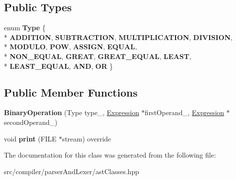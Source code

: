 \subsection*{Public Types}
\begin{DoxyCompactItemize}
\item 
enum {\bfseries Type} \{ \\*
{\bfseries A\+D\+D\+I\+T\+I\+ON}, 
{\bfseries S\+U\+B\+T\+R\+A\+C\+T\+I\+ON}, 
{\bfseries M\+U\+L\+T\+I\+P\+L\+I\+C\+A\+T\+I\+ON}, 
{\bfseries D\+I\+V\+I\+S\+I\+ON}, 
\\*
{\bfseries M\+O\+D\+U\+LO}, 
{\bfseries P\+OW}, 
{\bfseries A\+S\+S\+I\+GN}, 
{\bfseries E\+Q\+U\+AL}, 
\\*
{\bfseries N\+O\+N\+\_\+\+E\+Q\+U\+AL}, 
{\bfseries G\+R\+E\+AT}, 
{\bfseries G\+R\+E\+A\+T\+\_\+\+E\+Q\+U\+AL}, 
{\bfseries L\+E\+A\+ST}, 
\\*
{\bfseries L\+E\+A\+S\+T\+\_\+\+E\+Q\+U\+AL}, 
{\bfseries A\+ND}, 
{\bfseries OR}
 \}\hypertarget{classslang__AST__NODES_1_1BinaryOperation_ace9b829d1a97c814f923a04027be5bc5}{}\label{classslang__AST__NODES_1_1BinaryOperation_ace9b829d1a97c814f923a04027be5bc5}

\end{DoxyCompactItemize}
\subsection*{Public Member Functions}
\begin{DoxyCompactItemize}
\item 
{\bfseries Binary\+Operation} (Type type\+\_\+, \hyperlink{classslang__AST__NODES_1_1Expression}{Expression} $\ast$first\+Operand\+\_\+, \hyperlink{classslang__AST__NODES_1_1Expression}{Expression} $\ast$second\+Operand\+\_\+)\hypertarget{classslang__AST__NODES_1_1BinaryOperation_a0f81ad9d8548cf8fe9036a1ac2cd946a}{}\label{classslang__AST__NODES_1_1BinaryOperation_a0f81ad9d8548cf8fe9036a1ac2cd946a}

\item 
void {\bfseries print} (F\+I\+LE $\ast$stream) override\hypertarget{classslang__AST__NODES_1_1BinaryOperation_a73846657effdef8eaf520da3e25f61a2}{}\label{classslang__AST__NODES_1_1BinaryOperation_a73846657effdef8eaf520da3e25f61a2}

\end{DoxyCompactItemize}


The documentation for this class was generated from the following file\+:\begin{DoxyCompactItemize}
\item 
src/compiler/parser\+And\+Lexer/ast\+Classes.\+hpp\end{DoxyCompactItemize}
